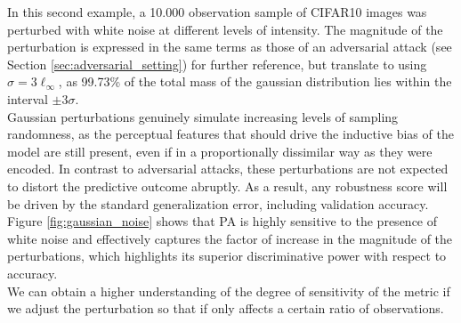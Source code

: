 In this second example, a 10.000 observation sample of CIFAR10
\cite{krizhevskyLearningMultipleLayers}
images was perturbed with white noise at different levels of intensity. The 
magnitude of the perturbation is expressed in the same terms as those of an adversarial 
attack (see Section \ref{sec:adversarial_setting}) for further 
reference, but translate to using $\sigma = 3 \ell_\infty$, as 99.73\% of the
total mass of the gaussian distribution lies within the interval $\pm 3\sigma$. \\

Gaussian perturbations genuinely simulate increasing levels of sampling randomness, as the 
perceptual features that should drive the inductive bias of the model are still present, even 
if in a proportionally dissimilar way as they were encoded. In contrast to adversarial attacks, 
these perturbations are not expected to distort the predictive outcome abruptly. As a result, 
any robustness score will be driven by the standard generalization error, including validation 
accuracy. Figure \ref{fig:gaussian_noise} shows that 
PA is highly sensitive to the presence of white noise and effectively captures the factor 
of increase in the magnitude of the perturbations, which highlights its superior discriminative 
power with respect to accuracy. \\

We can obtain a higher understanding of the degree of
sensitivity of the metric if we adjust the perturbation so that if only affects
a certain ratio of observations. \\


